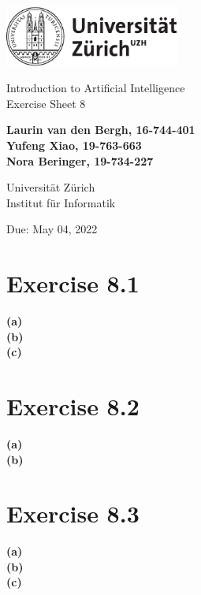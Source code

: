 \documentclass[12pt]{article}
\begin{document}
\begin{titlepage}
\includegraphics[height=20mm]{../images/uzh_logo}\\

\begin{flushleft}

\vspace{2cm}

{\Large Introduction to Artificial Intelligence\\Exercise Sheet 8}\\

\vspace{4cm}

\textbf{Laurin van den Bergh, 16-744-401\\Yufeng Xiao, 19-763-663\\Nora Beringer, 19-734-227}\\

\vspace{2cm}

Universität Zürich\\
Institut für Informatik

\vfill Due: May 04, 2022

\vspace{3cm}


\end{flushleft}
\end{titlepage}

\newpage

\section*{Exercise 8.1}

\textbf{(a)}\\
\textbf{(b)}\\
\textbf{(c)}

\section*{Exercise 8.2}

\textbf{(a)}\\
\textbf{(b)}

\section*{Exercise 8.3}

\textbf{(a)}\\
\textbf{(b)}\\
\textbf{(c)}
\end{document}
